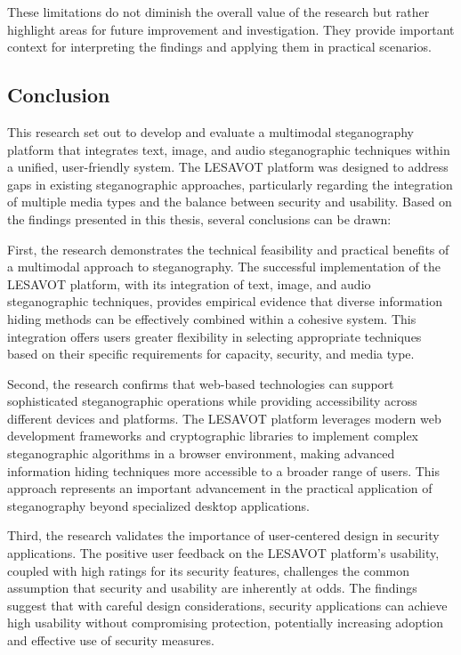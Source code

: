 \documentclass[12pt, a4paper, oneside]{book}
\begin{document}
These limitations do not diminish the overall value of the research but rather highlight areas for future improvement and investigation. They provide important context for interpreting the findings and applying them in practical scenarios.

\subsection{Conclusion}

This research set out to develop and evaluate a multimodal steganography platform that integrates text, image, and audio steganographic techniques within a unified, user-friendly system. The LESAVOT platform was designed to address gaps in existing steganographic approaches, particularly regarding the integration of multiple media types and the balance between security and usability. Based on the findings presented in this thesis, several conclusions can be drawn:

First, the research demonstrates the technical feasibility and practical benefits of a multimodal approach to steganography. The successful implementation of the LESAVOT platform, with its integration of text, image, and audio steganographic techniques, provides empirical evidence that diverse information hiding methods can be effectively combined within a cohesive system. This integration offers users greater flexibility in selecting appropriate techniques based on their specific requirements for capacity, security, and media type.

Second, the research confirms that web-based technologies can support sophisticated steganographic operations while providing accessibility across different devices and platforms. The LESAVOT platform leverages modern web development frameworks and cryptographic libraries to implement complex steganographic algorithms in a browser environment, making advanced information hiding techniques more accessible to a broader range of users. This approach represents an important advancement in the practical application of steganography beyond specialized desktop applications.

Third, the research validates the importance of user-centered design in security applications. The positive user feedback on the LESAVOT platform's usability, coupled with high ratings for its security features, challenges the common assumption that security and usability are inherently at odds. The findings suggest that with careful design considerations, security applications can achieve high usability without compromising protection, potentially increasing adoption and effective use of security measures.
\end{document}
